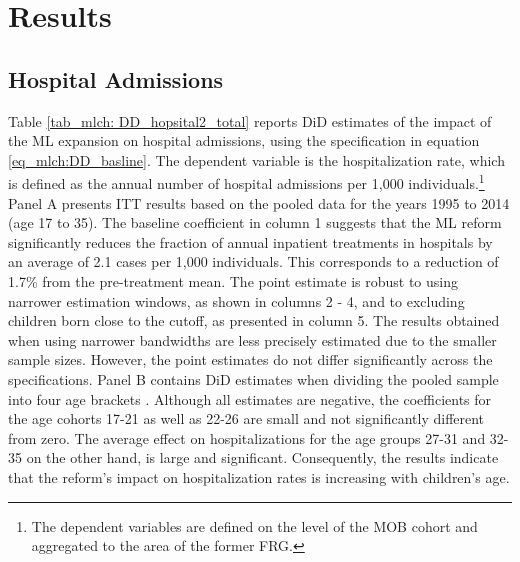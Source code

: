 \section{Results}\label{sec_mlch:results}

\subsection{Hospital Admissions}


Table \ref{tab_mlch: DD_hopsital2_total} reports DiD estimates of the impact of the ML expansion on hospital admissions, using the specification in equation \ref{eq_mlch:DD_basline}. The dependent variable is the hospitalization rate, which is defined as the annual number of hospital admissions per 1,000 individuals.\footnote{The dependent variables are defined on the level of the MOB cohort and aggregated to the area of the former FRG.} Panel A presents ITT results based on the pooled data for the years 1995 to 2014 (age 17 to 35). The baseline coefficient in column 1 suggests that the ML reform significantly reduces the fraction of annual inpatient treatments in hospitals by an average of 2.1 cases per 1,000 individuals. This corresponds to a reduction of 1.7\% from the pre-treatment mean. The point estimate is robust to using narrower estimation windows, as shown in columns 2 - 4, and to excluding children born close to the cutoff, as presented in column 5. The results obtained when using narrower bandwidths are less precisely estimated due to the smaller sample sizes. However, the point estimates do not differ significantly across the specifications. Panel B contains DiD estimates when dividing the pooled sample into four age brackets \label{rev_mlch: editor_comprehension_interaction}. Although all estimates are negative, the coefficients for the age cohorts 17-21 as well as 22-26 are small and not significantly different from zero. The average effect on hospitalizations for the age groups 27-31 and 32-35 on the other hand, is large and significant. Consequently, the results indicate that the reform's impact on hospitalization rates is increasing with children's age.

